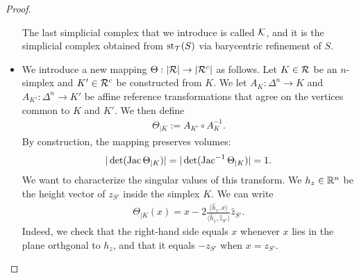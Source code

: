 \documentclass[10pt,letterpaper]{article}
\begin{document}
\begin{proof}
\begin{itemize}
        The last simplicial complex that we introduce is called ${\mathcal K}$,
        and it is the simplicial complex obtained from $\operatorname{st}_{{\mathcal T}}(S)$ via barycentric refinement of $S$. 
        
                
        \item 
        We introduce a new mapping $\Theta : |{\mathcal R}| \rightarrow |{\mathcal R}^c|$ as follows.
        Let $K \in {\mathcal R}$ be an $n$-simplex and $K' \in {\mathcal R}^{c}$ be constructed from $K$.
        We let $A_{K} : \Delta^{n} \rightarrow K$ and $A_{K'} : \Delta^{n} \rightarrow K'$
        be affine reference transformations
        that agree on the vertices common to $K$ and $K'$.
        We then define 
        \begin{align*}
            \Theta_{|K} := A_{K'} \circ A_{K}^{-1}.
        \end{align*}
        By construction, the mapping preserves volumes:
        \begin{align*}
            |\det( \operatorname{{\rm Jac}}      \Theta_{|K} )|
            = 
            |\det( \operatorname{{\rm Jac}}^{-1} \Theta_{|K} )|
            =
            1
            .
        \end{align*}
        We want to characterize the singular values of this transform. 
        We $h_{z} \in {\mathbb R}^{n}$ be the height vector of $z_{S'}$ inside the simplex $K$.
        We can write
        \begin{align*}
            \Theta_{|K}(x) 
            = 
            x
            - 
            2 \frac{\langle \hat h_{z}, x \rangle}{\langle \hat h_{z}, \hat z_{S'} \rangle}
            \hat z_{S'}
            .
        \end{align*}
        Indeed, we check that the right-hand side equals $x$ whenever $x$ lies in the plane orthgonal to $h_{z}$,
        and that it equals $-z_{S'}$ when $x = z_{S'}$.

\end{itemize}
\end{proof}
\end{document}

